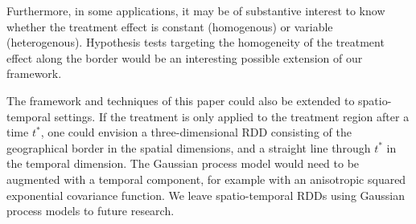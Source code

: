 Furthermore, in some applications, it may be of substantive interest to know whether the treatment effect is constant (homogenous) or variable (heterogenous).
Hypothesis tests targeting the homogeneity of the treatment effect along the border would be an interesting possible extension of our framework.

The framework and techniques of this paper could also be extended to spatio-temporal settings.
If the treatment is only applied to the treatment region after a time \(t^*\), one could envision a three-dimensional RDD consisting of the geographical border in the spatial dimensions, and a straight line through \(t^*\) in the temporal dimension.
The Gaussian process model would need to be augmented with a temporal component, for example with an anisotropic squared exponential covariance function.
We leave spatio-temporal RDDs using Gaussian process models to future research.



